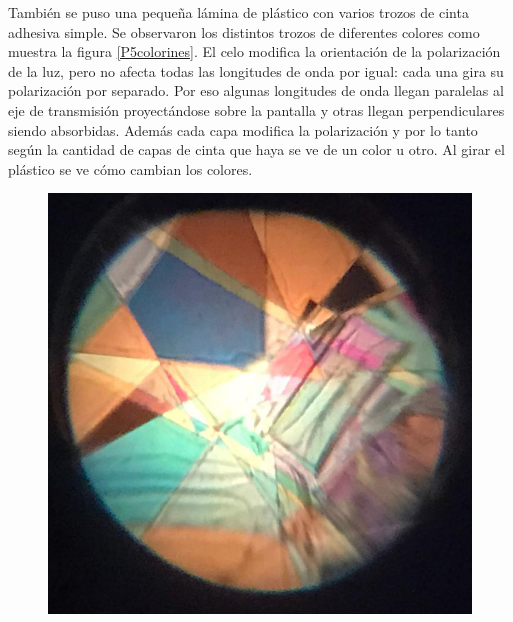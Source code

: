 \documentclass[12pt]{article}
\numberwithin{table}{section}
\numberwithin{figure}{section}
\numberwithin{equation}{section}
\begin{document}
También se puso una pequeña lámina de plástico con varios trozos de cinta adhesiva simple. Se observaron los distintos trozos de diferentes colores como muestra la figura \ref{P5colorines}. El celo modifica la orientación de la polarización de la luz, pero no afecta todas las longitudes de onda por igual: cada una gira su polarización por separado. Por eso algunas longitudes de onda llegan paralelas al eje de transmisión proyectándose sobre la pantalla y otras llegan perpendiculares siendo absorbidas. Además cada capa modifica la polarización y por lo tanto según la cantidad de capas de cinta que haya se ve de un color u otro. Al girar el plástico se ve cómo cambian los colores.

\begin{figure}[!ht]
	\centering
	\begin{minipage}{0.45\textwidth}
		\includegraphics[scale = 0.25]{P5Celo1.jpg}
	\end{minipage}
	\begin{minipage}{0.45\textwidth}

\end{minipage}
\end{figure}
\end{document}
